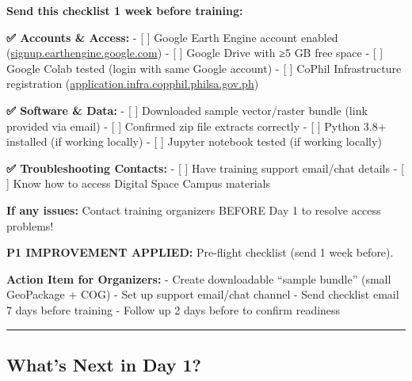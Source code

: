 \documentclass[
  letterpaper,
  DIV=11,
  numbers=noendperiod]{scrartcl}
\begin{document}
\begin{tcolorbox}[enhanced jigsaw, left=2mm, opacityback=0, toprule=.15mm, breakable, title=\textcolor{quarto-callout-note-color}{\faInfo}\hspace{0.5em}{P1 IMPROVEMENT: Before Day 1 Hands-On Sessions}, colbacktitle=quarto-callout-note-color!10!white, arc=.35mm, titlerule=0mm, colback=white, bottomtitle=1mm, colframe=quarto-callout-note-color-frame, leftrule=.75mm, toptitle=1mm, rightrule=.15mm, bottomrule=.15mm, opacitybacktitle=0.6, coltitle=black]

\textbf{Send this checklist 1 week before training:}

\end{tcolorbox}

\textbf{✅ Accounts \& Access:} - {[} {]} Google Earth Engine account
enabled
(\href{https://signup.earthengine.google.com}{signup.earthengine.google.com})
- {[} {]} Google Drive with ≥5 GB free space - {[} {]} Google Colab
tested (login with same Google account) - {[} {]} CoPhil Infrastructure
registration
(\href{https://application.infra.copphil.philsa.gov.ph}{application.infra.copphil.philsa.gov.ph})

\textbf{✅ Software \& Data:} - {[} {]} Downloaded sample vector/raster
bundle (link provided via email) - {[} {]} Confirmed zip file extracts
correctly - {[} {]} Python 3.8+ installed (if working locally) - {[} {]}
Jupyter notebook tested (if working locally)

\textbf{✅ Troubleshooting Contacts:} - {[} {]} Have training support
email/chat details - {[} {]} Know how to access Digital Space Campus
materials

\textbf{If any issues:} Contact training organizers BEFORE Day 1 to
resolve access problems!

\textbf{P1 IMPROVEMENT APPLIED:} Pre-flight checklist (send 1 week
before).

\textbf{Action Item for Organizers:} - Create downloadable ``sample
bundle'' (small GeoPackage + COG) - Set up support email/chat channel -
Send checklist email 7 days before training - Follow up 2 days before to
confirm readiness

\begin{center}\rule{0.5\linewidth}{0.5pt}\end{center}

\subsection{What's Next in Day 1?}\label{whats-next-in-day-1}
\end{document}
